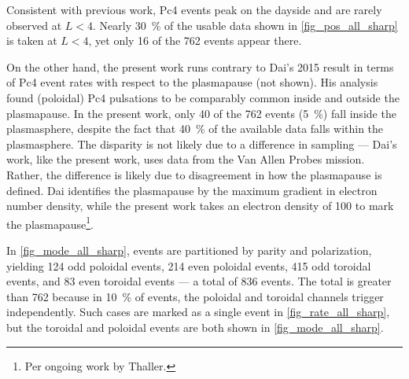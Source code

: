 Consistent with previous work, Pc4 events peak on the dayside and are rarely observed at $L < 4$. Nearly \SI{30}{\percent} of the usable data shown in \cref{fig_pos_all_sharp} is taken at $L < 4$, yet only 16 of the 762 events appear there. 

On the other hand, the present work runs contrary to Dai's 2015 result in terms of Pc4 event rates with respect to the plasmapause (not shown). His analysis found (poloidal) Pc4 pulsations to be comparably common inside and outside the plasmapause\cite{dai_2015}. In the present work, only 40 of the 762 events (\SI{5}{\percent}) fall inside the plasmasphere, despite the fact that \SI{40}{\percent} of the available data falls within the plasmasphere. The disparity is not likely due to a difference in sampling --- Dai's work, like the present work, uses data from the Van Allen Probes mission. Rather, the difference is likely due to disagreement in how the plasmapause is defined. Dai identifies the plasmapause by the maximum gradient in electron number density, while the present work takes an electron density of \SI{100}{\percc} to mark the plasmapause\footnote{Per ongoing work by Thaller. }. 

In \cref{fig_mode_all_sharp}, events are partitioned by parity and polarization, yielding 124 odd poloidal events, 214 even poloidal events, 415 odd toroidal events, and 83 even toroidal events --- a total of 836 events. The total is greater than 762 because in \about\SI{10}{\percent} of events, the poloidal and toroidal channels trigger independently. Such cases are marked as a single event in \cref{fig_rate_all_sharp}, but the toroidal and poloidal events are both shown in \cref{fig_mode_all_sharp}. 

